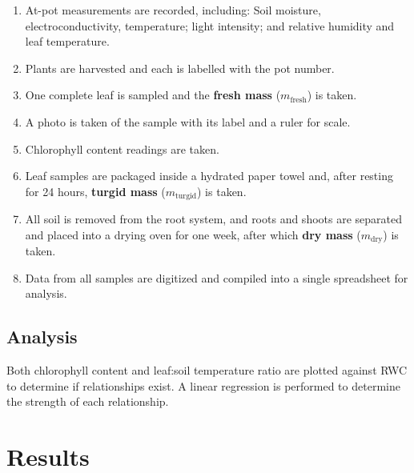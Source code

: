 \documentclass{report}
\begin{document}
\begin{enumerate}
    \item At-pot measurements are recorded, including: Soil moisture, electroconductivity, temperature; light intensity; and relative humidity and leaf temperature.
    \item Plants are harvested and each is labelled with the pot number.
    \item One complete leaf is sampled and the \textbf{fresh mass} ($m_{\text{fresh}}$) is taken.
    \item A photo is taken of the sample with its label and a ruler for scale.
    \item Chlorophyll content readings are taken.
    \item Leaf samples are packaged inside a hydrated paper towel and, after resting for 24 hours, \textbf{turgid mass} ($m_{\text{turgid}}$) is taken.
    \item All soil is removed from the root system, and roots and shoots are separated and placed into a drying oven for one week, after which \textbf{dry mass} ($m_{\text{dry}}$) is taken.
    \item Data from all samples are digitized and compiled into a single spreadsheet for analysis.
\end{enumerate}

\subsection{Analysis}

Both chlorophyll content and leaf:soil temperature ratio are plotted against RWC to determine if relationships exist. A linear regression is performed to determine the strength of each relationship.

\clearpage

\section{Results}

\end{document}
